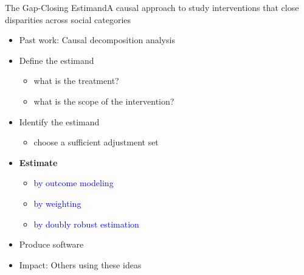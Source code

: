 \documentclass{beamer}
\newcommand\bblue[1]{{\color{blue}\textbf{#1}}}
\begin{document}
{\begin{frame}{The Gap-Closing Estimand}{A causal approach to study interventions that close disparities across social categories}
	\begin{itemize}
		\item Past work: Causal decomposition analysis
		\item Define the estimand
		\begin{itemize}
			\item what is the treatment?
			\item what is the scope of the intervention?
		\end{itemize}
		\item Identify the estimand
		\begin{itemize}
			\item choose a sufficient adjustment set
		\end{itemize}
		\item \bblue{Estimate}
		\begin{itemize}
			\item \textcolor{blue}{by outcome modeling}
			\item \textcolor{blue}{by weighting}
			\item \textcolor{blue}{by doubly robust estimation}
		\end{itemize}
		\item Produce software
		\item Impact: Others using these ideas
	\end{itemize}
\end{frame}

}
\end{document}
